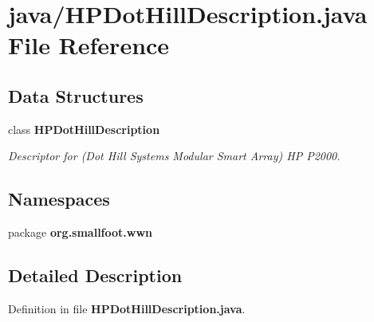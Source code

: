 \section{java/\-H\-P\-Dot\-Hill\-Description.java \-File \-Reference}
\label{HPDotHillDescription_8java}
\subsection*{\-Data \-Structures}
\begin{DoxyCompactItemize}
\item 
class {\bf \-H\-P\-Dot\-Hill\-Description}
\begin{DoxyCompactList}\small\item\em \-Descriptor for (\-Dot \-Hill \-Systems \-Modular \-Smart \-Array) \-H\-P \-P2000. \end{DoxyCompactList}\end{DoxyCompactItemize}
\subsection*{\-Namespaces}
\begin{DoxyCompactItemize}
\item 
package {\bf org.\-smallfoot.\-wwn}
\end{DoxyCompactItemize}


\subsection{\-Detailed \-Description}


\-Definition in file {\bf \-H\-P\-Dot\-Hill\-Description.\-java}.


